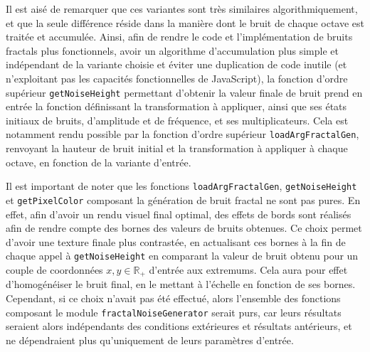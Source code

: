 \documentclass[11pt]{article}
\begin{document}
Il est aisé de remarquer que ces variantes sont très similaires algorithmiquement, et que la seule différence réside dans la manière dont le bruit de chaque octave est traitée et accumulée. Ainsi, afin de rendre le code et l'implémentation de bruits fractals plus fonctionnels, avoir un algorithme d'accumulation plus simple et indépendant de la variante choisie et éviter une duplication de code inutile (et n'exploitant pas les capacités fonctionnelles de JavaScript), la fonction d'ordre supérieur \texttt{getNoiseHeight} permettant d'obtenir la valeur finale de bruit prend en entrée la fonction définissant la transformation à appliquer, ainsi que ses états initiaux de bruits, d'amplitude et de fréquence, et ses multiplicateurs. Cela est notamment rendu possible par la fonction d'ordre supérieur \texttt{loadArgFractalGen}, renvoyant la hauteur de bruit initial et la transformation à appliquer à chaque octave, en fonction de la variante d'entrée.

Il est important de noter que les fonctions \texttt{loadArgFractalGen}, \texttt{getNoiseHeight} et \texttt{getPixelColor} composant la génération de bruit fractal ne sont pas pures. En effet, afin d'avoir un rendu visuel final optimal, des effets de bords sont réalisés afin de rendre compte des bornes des valeurs de bruits obtenues. Ce choix permet d'avoir une texture finale plus contrastée, en actualisant ces bornes à la fin de chaque appel à \texttt{getNoiseHeight} en comparant la valeur de bruit obtenu pour un couple de coordonnées $x, y \in \mathbb{R}_{+}$ d'entrée aux extremums. Cela aura pour effet d'homogénéiser le bruit final, en le mettant à l'échelle en fonction de ses bornes. Cependant, si ce choix n'avait pas été effectué, alors l'ensemble des fonctions composant le module \texttt{fractalNoiseGenerator} serait purs, car leurs résultats seraient alors indépendants des conditions extérieures et résultats antérieurs, et ne dépendraient plus qu'uniquement de leurs paramètres d'entrée.
\end{document}
